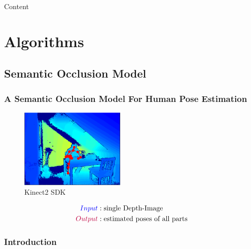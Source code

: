 \documentclass[xcolor=dvipsnames]{beamer}
\begin{document}
\begin{frame}{Content}
	\large
	\tableofcontents[subsubsectionstyle=hide]
\end{frame}

\section{Algorithms}
\subsection{Semantic Occlusion Model}
{
\begin{frame}
	\frametitle{A Semantic Occlusion Model For Human Pose Estimation}
	\vline
	\Large

	\begin{figure}
		\includegraphics[width=5cm]{img/HPE.png}
		\caption{Kinect2 SDK}
	\end{figure}
		
	\begin{align*}
		\textcolor{blue}{Input}&:  \text{single Depth-Image} \\
		\textcolor{purple}{Output}&: \text{estimated poses of all parts}
	\end{align*}
\end{frame}}

\subsubsection{Introduction}
\end{document}
